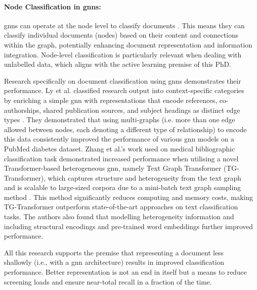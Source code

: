 \documentclass[10pt,oneside]{book}
\begin{document}
\paragraph{Node Classification in \glspl*{gnn}:}
\glspl*{gnn} can operate at the node level to classify documents \cite{kipf_semi-supervised_2017, yao_graph_2018, wang_graph_2024, rong_dropedge_2020}. This means they can classify individual documents (nodes) based on their content and connections within the graph, potentially enhancing document representation and information integration. Node-level classification is particularly relevant when dealing with unlabelled data, which aligns with the active learning premise of this PhD.

Research specifically on document classification using \glspl*{gnn} demonstrates their performance. Ly et al. classified research output into context-specific categories by enriching a simple \gls*{gnn} with representations that encode references, co-authorships, shared publication sources, and subject headings as distinct edge types \cite{ly_article_2024}. They demonstrated that using multi-graphs (i.e. more than one edge allowed between nodes, each denoting a different type of relationship) to encode this data consistently improved the performance of various \gls*{gnn} models on a PubMed diabetes dataset. Zhang et al.'s work used on medical bibliographic classification task demonstrated increased performance when utilising a novel Transformer-based heterogeneous \gls*{gnn}, namely Text Graph Transformer (TG-Transformer), which captures structure and heterogeneity from the text graph and is scalable to large-sized corpora due to a mini-batch text graph sampling method \cite{zhang_evaluating_2020}. This method significantly reduces computing and memory costs, making TG-Transformer outperform state-of-the-art approaches on text classification tasks. The authors also found that modelling heterogeneity information and including structural encodings and pre-trained word embeddings further improved performance.

All this research supports the premise that representing a document less shallowly (i.e., with a \gls*{gnn} architecture) results in improved classification performance. Better representation is not an end in itself but a means to reduce screening loads and ensure near-total recall in a fraction of the time.

\end{document}
